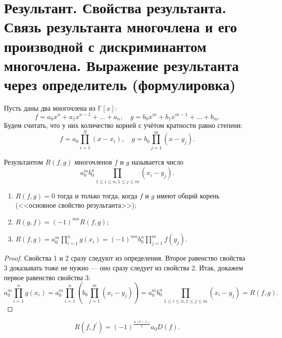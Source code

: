 \section{Результант. Свойства результанта. Связь результанта многочлена и его производной с дискриминантом многочлена. Выражение результанта через определитель (формулировка)}

Пусть даны два многочлена из $\mathbb{F}[x]$:
$$
f = a_0x^n + a_1x^{n - 1} + \ldots + a_n,\quad g = b_0x^m + b_1x^{m - 1} + \ldots + b_m.
$$
Будем считать, что у них количество корней с учётом кратности равно степени:
$$
f = a_0\prod_{i = 1}^N(x - x_i),\quad g = b_0\prod_{j = 1}^m(x - y_j).
$$

\begin{definition}
    Результантом $R(f, g)$ многочленов $f$ и $g$ называется число
    $$
    a_0^mb_0^n\prod_{1 \leqslant i \leqslant n, 1 \leqslant j \leqslant m}(x_i - y_j).
    $$
\end{definition}

\begin{theorem}
    \begin{enumerate}[nolistsep]
        \item $R(f, g) = 0$ тогда и только тогда, когда $f$ и $g$ имеют общий корень (<<основное свойство результанта>>);
        \item $R(g, f) = (-1)^{mn}R(f, g)$;
        \item $\displaystyle R(f, g) = a_0^m\prod_{i = 1}^ng(x_i) = (-1)^{mn}b_0^n\prod_{j = 1}^mf(y_j)$.
    \end{enumerate}
\end{theorem}

\begin{proof}
    Свойства 1 и 2 сразу следуют из определения. Второе равенство свойства 3 доказывать тоже не нужно --- оно сразу следует из свойства 2. Итак, докажем первое равенство свойства 3:
    $$
    a_0^m\prod_{i = 1}^ng(x_i) = a_0^m\prod_{i = 1}^n\left(b_0\prod_{j = 1}^m(x_i - y_j)\right) = a_0^mb_0^n\prod_{1 \leqslant i \leqslant n, 1 \leqslant j \leqslant m}(x_i - y_j) = R(f, g).
    $$
\end{proof}

\begin{theorem}
    $$
    R(f, f^\prime) = (-1)^{\frac{n(n - 1)}{2}}a_0D(f).
    $$
\end{theorem}

